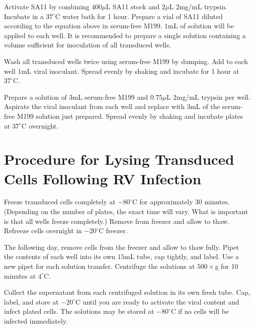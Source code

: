 Activate SA11 by combining $400\mu$L SA11 stock and $2\mu$L $2$mg/mL trypsin. Incubate in a $37^{\circ}$C water bath for 1 hour. Prepare a vial of SA11 diluted according to the equation above in serum-free M199. $1$mL of solution will be applied to each well. It is recommended to prepare a single solution containing a volume sufficient for inoculation of all transduced wells.

Wash all transduced wells twice using serum-free M199 by dumping. Add to each well $1$mL viral inoculant. Spread evenly by shaking and incubate for 1 hour at $37^{\circ}$C.

Prepare a solution of $3$mL serum-free M199 and $0.75\mu$L $2$mg/mL trypsin per well. Aspirate the viral inoculant from each well and replace with $3$mL of the serum-free M199 solution just prepared. Spread evenly by shaking and incubate plates at $37^{\circ}$C overnight.

\section{Procedure for Lysing Transduced Cells Following RV Infection}

Freeze transduced cells completely at $-80^{\circ}$C for approximately 30 minutes.  (Depending on the number of plates, the exact time will vary. What is important is that all wells freeze completely.) Remove from freezer and allow to thaw. Refreeze cells overnight in $-20^{\circ}$C freezer.

The following day, remove cells from the freezer and allow to thaw fully. Pipet the contents of each well into its own $15$mL tube, cap tightly, and label. Use a new pipet for each solution transfer. Centrifuge the solutions at $500\times$g for 10 minutes at $4^{\circ}$C.

Collect the supernatant from each centrifuged solution in its own fresh tube. Cap, label, and store at $-20^{\circ}$C until you are ready to activate the viral content and infect plated cells. The solutions may be stored at $-80^{\circ}$C if no cells will be infected immediately.